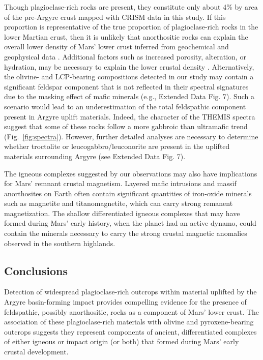 \documentclass[12pt]{article}
\begin{document}
Though plagioclase-rich rocks are present, they constitute only about 4\% by area of the pre-Argyre crust mapped with CRISM data in this study. If this proportion is representative of the true proportion of plagioclase-rich rocks in the lower Martian crust, then it is unlikely that anorthositic rocks can explain the overall lower density of Mars' lower crust inferred from geochemical and geophysical data \citep{Baratoux2014, Goossens2017, Knapmeyer-Endrun2021, Drilleau2023, Joshi2023}. Additional factors such as increased porosity, alteration, or hydration, may be necessary to explain the lower crustal density \citep{Ehlmann2010, Bandfield2013, Sun2015, Wordsworth2017, Goossens2017,Scheller2020, Wieczorek2022, Carrasco2023}. Alternatively, the olivine- and LCP-bearing compositions detected in our study may contain a significant feldspar component that is not reflected in their spectral signatures due to the masking effect of mafic minerals (e.g., Extended Data Fig. 7). Such a scenario would lead to an underestimation of the total feldspathic component present in Argyre uplift materials. Indeed, the character of the THEMIS spectra suggest that some of these rocks follow a more gabbroic than ultramafic trend (Fig.~\ref{fig:spectra}). However, further detailed analyses are necessary to determine whether troctolite or leucogabbro/leuconorite are present in the uplifted materials surrounding Argyre (see Extended Data Fig. 7).

The igneous complexes suggested by our observations may also have implications for Mars' remnant crustal magnetism. Layered mafic intrusions and massif anorthosites on Earth often contain significant quantities of iron-oxide minerals such as magnetite and titanomagnetite, which can carry strong remanent magnetization. The shallow differentiated igneous complexes that may have formed during Mars' early history, when the planet had an active dynamo, could contain the minerals necessary to carry the strong crustal magnetic anomalies observed in the southern highlands.

\subsection*{Conclusions}

Detection of widespread plagioclase-rich outcrops within material uplifted by the Argyre basin-forming impact provides compelling evidence for the presence of feldspathic, possibly anorthositic, rocks as a component of Mars' lower crust. The association of these plagioclase-rich materials with olivine and pyroxene-bearing outcrops suggests they represent components of ancient, differentiated complexes of either igneous or impact origin (or both) that formed during Mars' early crustal development.
\end{document}
